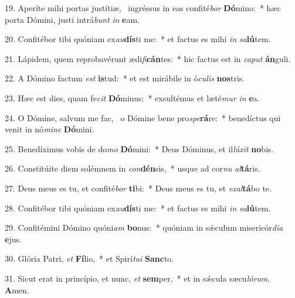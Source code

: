 19. Aperíte mihi portas justítiæ, \dag\  ingréssus in eas confité\textit{bor} \textbf{Dó}mino:~*  hæc porta Dómini, justi intrá\textit{bunt} \textit{in} \textbf{e}am.\

20. Confitébor tibi quóniam ex\textit{au}\textbf{dís}ti me:~*  et factus es mihi \textit{in} \textit{sa}\textbf{lú}tem.\

21. Lápidem, quem reprobavérunt ædi\textit{fi}\textbf{cán}tes:~*  hic factus est in \textit{ca}\textit{put} \textbf{án}guli.\

22. A Dómino factum \textit{est} \textbf{is}tud:~*  et est mirábile in ó\textit{cu}\textit{lis} \textbf{nos}tris.\

23. Hæc est dies, quam fe\textit{cit} \textbf{Dó}minus:~*  exsultémus et læté\textit{mur} \textit{in} \textbf{e}a.\

24. O Dómine, salvum me fac, \dag\  o Dómine bene pro\textit{spe}\textbf{rá}re:~*  benedíctus qui venit in nó\textit{mi}\textit{ne} \textbf{Dó}mini.\

25. Benedíximus vobis de do\textit{mo} \textbf{Dó}mini:~*  Deus Dóminus, et il\textit{lú}\textit{xit} \textbf{no}bis.\

26. Constitúite diem solémnem in \textit{con}\textbf{dén}sis,~*  usque ad cor\textit{nu} \textit{al}\textbf{tá}ris.\

27. Deus meus es tu, et confité\textit{bor} \textbf{ti}bi:~*  Deus meus es tu, et \textit{ex}\textit{al}\textbf{tá}bo te.\

28. Confitébor tibi quóniam ex\textit{au}\textbf{dís}ti me:~*  et factus es mihi \textit{in} \textit{sa}\textbf{lú}tem.\

29. Confitémini Dómino quóni\textit{am} \textbf{bo}nus:~*  quóniam in sǽculum misericór\textit{di}\textit{a} \textbf{e}jus.\

30. Glória Patri, \textit{et} \textbf{Fí}lio,~*  et Spirí\textit{tu}\textit{i} \textbf{Sanc}to.\

31. Sicut erat in princípio, et nunc, \textit{et} \textbf{sem}per,~*  et in sǽcula sæcu\textit{ló}\textit{rum}. \textbf{A}men.\

